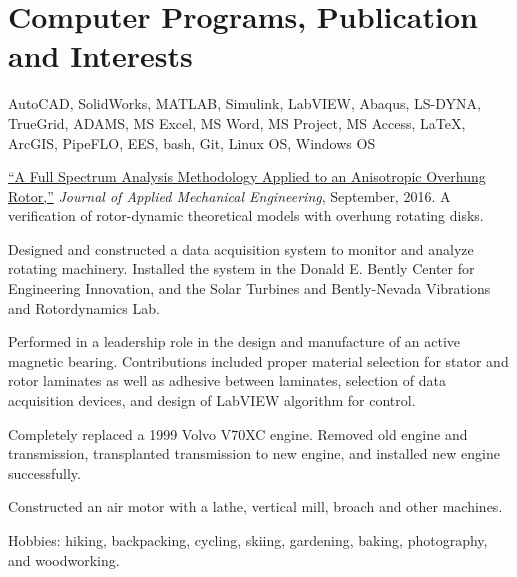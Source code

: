 \documentclass[10pt]{article} %
\begin{document}
\section{Computer Programs, Publication and Interests}
\begin{adjustwidth}{-7pt}{7pt}


	 \footnotesize{AutoCAD, SolidWorks, MATLAB, Simulink, LabVIEW, Abaqus, LS-DYNA, TrueGrid, ADAMS, MS Excel, MS Word, MS Project, MS Access, {\fb \LaTeX}\setmainfont[SmallCapsFont=Fontin SmallCaps]{Fontin-Regular},  ArcGIS, PipeFLO, EES, bash, Git, Linux OS, Windows OS}\par
	 \footnotesize{ \href{https://www.omicsgroup.org/journals/a-full-spectrum-analysis-methodology-applied-to-an-anisotropic-overhung-rotor-2168-9873-1000232.php?aid=81544}{``A Full Spectrum Analysis Methodology Applied to an Anisotropic Overhung Rotor,''} \textit{Journal of Applied Mechanical Engineering}, September, 2016. A verification of rotor-dynamic theoretical models with overhung rotating disks.}\par
	 \footnotesize{Designed and constructed a data acquisition system to monitor and analyze rotating machinery. Installed the system in the Donald E. Bently Center for Engineering Innovation, and the Solar Turbines and Bently-Nevada Vibrations and Rotordynamics Lab.}\par
	 \footnotesize{Performed in a leadership role in the design and manufacture of an active magnetic bearing. Contributions included proper material selection for stator and rotor laminates as well as adhesive between laminates, selection of data acquisition devices, and design of LabVIEW algorithm for control.}\par
	 \footnotesize{Completely replaced a 1999 Volvo V70XC engine. Removed old engine and transmission, transplanted transmission to new engine, and installed new engine successfully.}\par
	 \footnotesize{Constructed an air motor with a lathe, vertical mill, broach and other machines.}\par
	 \footnotesize{Hobbies: hiking, backpacking, cycling, skiing, gardening, baking, photography, and woodworking.}\par





\end{adjustwidth}
\end{document}
